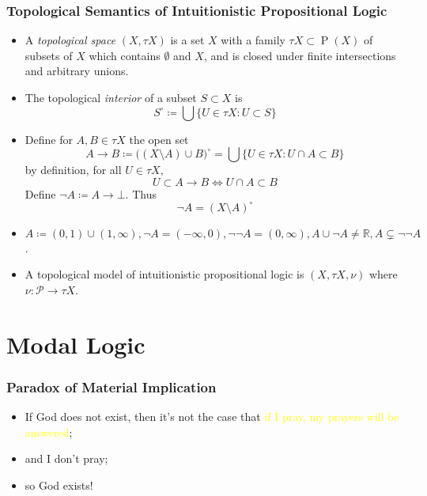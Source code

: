 \documentclass[UTF8,aspectratio=43,11pt,colorlinks,compress,openany]{beamer}%
\begin{document}
\begin{frame}\frametitle{Topological Semantics of Intuitionistic Propositional Logic}
\begin{itemize}
	\item A \emph{topological space} $(X,\tau X)$ is a set $X$ with a family $\tau X\subset\operatorname{P}(X)$ of subsets of $X$ which contains $\emptyset$ and $X$, and is closed under finite intersections and arbitrary unions.
	\item The topological \emph{interior} of a subset $S\subset X$ is
	\[S^\circ\coloneqq \bigcup\big\{U\in\tau X: U\subset S\big\}\]
	\item Define for $A,B\in\tau X$ the open set
	\[A\to B \coloneqq \big((X\setminus A)\cup B\big)^\circ=\bigcup\big\{U\in\tau X:U\cap A\subset B\big\}\]
	by definition, for all $U\in\tau X$,
	\[U\subset A\to B\iff U\cap A\subset B\]
	Define $\neg A\coloneqq A\to\bot$. Thus
	\[\neg A=(X\setminus A)^\circ\]
	\item $A\coloneqq (0,1)\cup(1,\infty), \neg A=(-\infty,0), \neg\neg A=(0,\infty), A\cup\neg A\ne\mathbb{R}, A\subsetneq\neg\neg A$.
	\item A topological model of intuitionistic propositional logic is $(X,\tau X,\nu)$ where $\nu:\mathcal{P}\to\tau X$.
\end{itemize}
\end{frame}


\section{Modal Logic}


\begin{frame}\frametitle{Paradox of Material Implication}
	\begin{itemize}
		\item If God does not exist, then it's not the case that \textcolor{yellow}{if I pray, my prayers will be answered};
		\item and I don't pray;
		\item so God exists!
	\end{itemize}
\end{frame}
\end{document}
